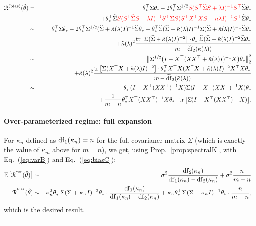 \documentclass[11pt]{article}
\newcommand{\BEAS}{\begin{eqnarray*}}
\newcommand{\EEAS}{\end{eqnarray*}}
\newcommand{\BEA}{\begin{eqnarray}}
\newcommand{\EEA}{\end{eqnarray}}
\newcommand{\tr}{\mathop{ \rm tr}}
\newcommand{\idm}{I}
\newcommand{\BlackBox}{\rule{1.5ex}{1.5ex}}  %
\newenvironment{proof}{\par\noindent{\bf Proof\ }}{\hfill\BlackBox\\[2mm]}
\newcommand{\eq}[1]{Eq.~(\ref{eq:#1})}
\def \hS{ \widehat{ \Sigma} }
\def \S{  { \Sigma} }
\def \E{{\mathbb E}}
\begin{document}
\begin{proof}
\BEA
\notag
\mathcal{R}^{({\rm bias})}(\hat \theta) & = & \theta_\ast ^\top \S \theta_\ast
- 2 \theta_\ast^\top \S^{1/2} \textcolor{red}{S
( S^\top \hS S+  \lambda \idm )^{-1}  S^\top} \hS   \theta_\ast \\
\notag & & \hspace*{2cm} + \theta_\ast^\top
  \hS  \textcolor{red}{S  (S^\top \hS S + \lambda \idm )^{-1}   S^\top 
\S
S  ( S^\top X^\top X S+ n\lambda \idm)^{-1} S^\top} \hS
\theta_\ast 
\\
\notag & \sim & \theta_\ast ^\top \S \theta_\ast
- 2 \theta_\ast^\top \S^{1/2} 
(  \hS + \tilde{\kappa}(\lambda ) \idm )^{-1}   \hS   \theta_\ast  + \theta_\ast^\top
  \hS (  \hS + \tilde{\kappa}(\lambda  ) \idm )^{-1} 
\S
(  \hS + \tilde{\kappa}(\lambda  ) \idm )^{-1}  \hS
\theta_\ast \\
\notag&&  + \tilde{\kappa}(\lambda  ) ^2 
\frac{ \tr \big[ \S  ( \hS + \tilde{\kappa}(\lambda )  \idm)^{-2}   \big] \cdot \theta_\ast^\top \hS  ( \hS + \tilde{\kappa}(\lambda )  \idm)^{-2}    \hS \theta_\ast }{m -  \widetilde{{\rm df}}_2(\tilde{\kappa}(\lambda))}
\\ 
\notag & \sim & \big\| \S^{1/2} \big(
\idm - X^\top (  XX^\top   + \tilde{\kappa}(\lambda  ) \idm )^{-1} X  \big) \theta_\ast\big\|_2^2
\\
\notag & &\hspace*{2cm}  + \tilde{\kappa}(\lambda   ) ^2 
\frac{ \tr \big[ \S  ( X^\top X + \tilde{\kappa}(\lambda )  \idm)^{-2}   \big] \cdot \theta_\ast^\top X^\top X  ( X^\top X + \tilde{\kappa}(\lambda  )  \idm)^{-2}    X^\top X \theta_\ast }{ m - \widetilde{{\rm df}}_2(\tilde{\kappa}(\lambda))}
\\ 
\notag & \sim  & 
\theta_\ast^\top ( \idm - X^\top (XX^\top)^{-1}  X) \S  ( \idm - X^\top (XX^\top)^{-1}  X) \theta_\ast
  \\
 \label{eq:biasC} & & \hspace*{3cm} + \frac{1}{m-n} \theta_\ast^\top 
X^\top ( X  X^\top)^{-1}  X  \theta_\ast     \cdot \tr\big[ \S  ( \idm - X^\top (XX^\top)^{-1} X)\big] .
\EEA
 
\paragraph{Over-parameterized regime: full expansion}
For $ \kappa_n $ defined as ${\rm df}_1(\kappa_n) = n$ for the full covariance matrix $\Sigma$ (which is exactly the value of $\kappa_m$ above for $m=n$), we get, using Prop.~\ref{prop:spectralK}, with \eq{varB} and \eq{biasC}:
\BEAS
\E \big[ \mathcal{R}^{^{\rm var}} (\hat{\theta}) \big]
& \sim & \sigma^2 \frac{ {\rm df}_2(\kappa_n) }{ {\rm df}_1(\kappa_n) -  {\rm df}_2(\kappa_n)}
+  \sigma^2 \frac{n}{m-n}  
\\
 \mathcal{R}^{^{\rm bias}} (\hat{\theta})  
& \sim & \kappa_n^2 \theta_\ast^\top \S (  \S + \kappa_n\idm)^{-2} \theta_\ast \cdot 
 \frac{ {\rm df}_1(\kappa_n) }{ {\rm df}_1(\kappa_n) -  {\rm df}_2(\kappa_n)}
 +  \kappa_n \theta_\ast^\top \S ( \S+\kappa_n \idm)^{-1} \theta_\ast \cdot \frac{n}{m-n},
\EEAS
 which is the desired result.
\end{proof}
\end{document}

